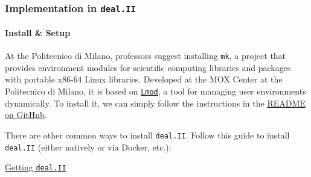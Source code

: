 \subsubsection{Implementation in \texttt{deal.II}}

\paragraph{Install \& Setup}

At the Politecnico di Milano, professors suggest installing \texttt{mk}, a project that provides environment modules for scientific computing libraries and packages with portable x86-64 Linux libraries. Developed at the MOX Center at the Politecnico di Milano, it is based on \href{https://lmod.readthedocs.io/en/latest/index.html}{\texttt{Lmod}}, a tool for managing user environments dynamically. To install it, we can simply follow the instructions in the \href{https://github.com/pcafrica/mk}{README on GitHub}.

\highspace
There are other common ways to install \texttt{deal.II}. Follow this guide to install \texttt{deal.II} (either natively or via Docker, etc.):
\begin{center}
    \href{https://github.com/dealii/dealii/wiki/Getting-deal.II}{Getting \texttt{deal.II}} \vspace{2em}
\end{center}

